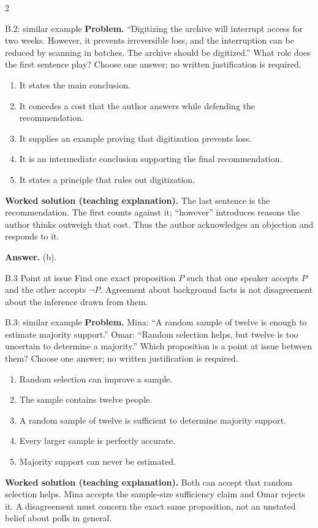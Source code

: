 \documentclass[10pt]{extarticle}
\begin{document}
\begin{multicols}{2}
\begin{workedbox}{B.2: similar example}
\textbf{Problem.} ``Digitizing the archive will interrupt access for two weeks. However, it prevents irreversible loss, and the interruption can be reduced by scanning in batches. The archive should be digitized.'' What role does the first sentence play? Choose one answer; no written justification is required.

\begin{enumerate}[label=(\alph*)]
\item It states the main conclusion.
\item It concedes a cost that the author answers while defending the recommendation.
\item It supplies an example proving that digitization prevents loss.
\item It is an intermediate conclusion supporting the final recommendation.
\item It states a principle that rules out digitization.
\end{enumerate}
\textbf{Worked solution (teaching explanation).} The last sentence is the recommendation. The first counts against it; ``however'' introduces reasons the author thinks outweigh that cost. Thus the author acknowledges an objection and responds to it.

\textbf{Answer.} (b).
\end{workedbox}

\begin{methodbox}{B.3 Point at issue}
Find one exact proposition $P$ such that one speaker accepts $P$ and the other
accepts $\neg P$. Agreement about background facts is not disagreement about the
inference drawn from them.
\end{methodbox}

\begin{workedbox}{B.3: similar example}
\textbf{Problem.} Mina: ``A random sample of twelve is enough to estimate majority support.'' Omar: ``Random selection helps, but twelve is too uncertain to determine a majority.'' Which proposition is a point at issue between them? Choose one answer; no written justification is required.

\begin{enumerate}[label=(\alph*)]
\item Random selection can improve a sample.
\item The sample contains twelve people.
\item A random sample of twelve is sufficient to determine majority support.
\item Every larger sample is perfectly accurate.
\item Majority support can never be estimated.
\end{enumerate}
\textbf{Worked solution (teaching explanation).} Both can accept that random selection helps. Mina accepts the sample-size sufficiency claim and Omar rejects it. A disagreement must concern the exact same proposition, not an unstated belief about polls in general.


\end{workedbox}
\end{multicols}
\end{document}
